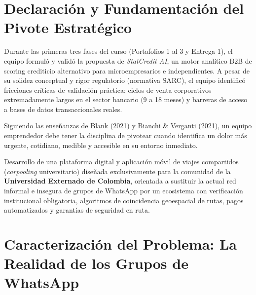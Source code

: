 \documentclass[11pt,a4paper]{article}
\begin{document}
\section{Declaraci\'on y Fundamentaci\'on del Pivote Estrat\'egico}

Durante las primeras tres fases del curso (Portafolios 1 al 3 y Entrega 1), el equipo formul\'o y valid\'o la propuesta de \textit{StatCredit AI}, un motor anal\'itico B2B de scoring crediticio alternativo para microempresarios e independientes. A pesar de su solidez conceptual y rigor regulatorio (normativa SARC), el equipo identific\'o fricciones cr\'iticas de validaci\'on pr\'actica: ciclos de venta corporativos extremadamente largos en el sector bancario (9 a 18 meses) y barreras de acceso a bases de datos transaccionales reales.

Siguiendo las ense\~nanzas de Blank (2021) y Bianchi \& Verganti (2021), un equipo emprendedor debe tener la disciplina de pivotear cuando identifica un dolor m\'as urgente, cotidiano, medible y accesible en su entorno inmediato.

\begin{tcolorbox}[colback=secondary!5,colframe=secondary,title=\textbf{Nuevo Enunciado del Proyecto: Wheels Externado}]
Desarrollo de una plataforma digital y aplicaci\'on m\'ovil de viajes compartidos (\textit{carpooling} universitario) dise\~nada exclusivamente para la comunidad de la \textbf{Universidad Externado de Colombia}, orientada a sustituir la actual red informal e insegura de grupos de WhatsApp por un ecosistema con verificaci\'on institucional obligatoria, algoritmos de coincidencia geoespacial de rutas, pagos automatizados y garant\'ias de seguridad en ruta.
\end{tcolorbox}

\section{Caracterizaci\'on del Problema: La Realidad de los Grupos de WhatsApp}
\end{document}
